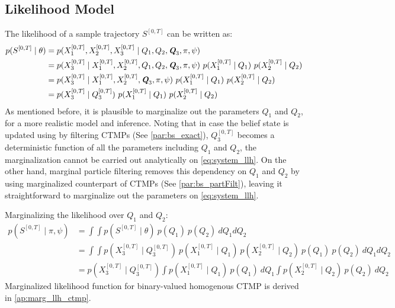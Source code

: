 \subsection{Likelihood Model}
 The likelihood of a sample trajectory $ S^{[0,T]} $ can be written as:
\begin{align}
p(S^{[0,T]} \mid \theta ) & = p(X_{1}^{[0, T]}, X_{2}^{[0, T]}, X_{3}^{[0, T]} \mid Q_{1}, Q_{2}, \textit{\textbf{Q}}_3, \pi, \psi) \nonumber\\
& = p(X_{3}^{[0, T]} \mid X_{1}^{[0, T]}, X_{2}^{[0, T]}, Q_{1}, Q_{2}, \textit{\textbf{Q}}_3, \pi, \psi) \ p(X_{1}^{[0, T]}\mid Q_{1}) \ p(X_{2}^{[0, T]}\mid Q_{2}) \nonumber\\ & = p(X_{3}^{[0, T]} \mid X_{1}^{[0, T]}, X_{2}^{[0, T]}, \textit{\textbf{Q}}_3, \pi, \psi) \ p(X_{1}^{[0, T]}\mid Q_{1}) \ p(X_{2}^{[0, T]}\mid Q_{2}) \nonumber\\ & = p(X_{3}^{[0, T]}\mid Q_{3}^{[0, T]}) \ p(X_{1}^{[0, T]}\mid Q_{1}) \ p(X_{2}^{[0, T]}\mid Q_{2}) 
\label{eq:system_llh}
\end{align}
As mentioned before, it is plausible to marginalize out the parameters $ Q_1 $ and $ Q_2 $, for a more realistic model and inference. Noting that in case the belief state is updated using by filtering CTMPs (See \cref{par:bs_exact}), $ Q_{3}^{[0, T]} $ becomes a deterministic function of all the parameters including $ Q_1 $ and $ Q_2 $, the marginalization cannot be carried out analytically on \autoref{eq:system_llh}. On the other hand, marginal particle filtering removes this dependency on $ Q_1 $ and $ Q_2 $ by using marginalized counterpart of CTMPs (See \cref{par:bs_partFilt}), leaving it straightforward to marginalize out the parameters on \autoref{eq:system_llh}.

Marginalizing the likelihood over $ Q_{1} $ and $ Q_{2} $:
\begin{align}
p(S^{[0,T]} \mid \pi, \psi ) & = 	\int \int p(S^{[0,T]} \mid \theta ) \ p(Q_{1}) \ p(Q_{2}) \ dQ_{1}dQ_{2} \nonumber\\ 
& = \int \int p(X_{3}^{[0, T]}\mid Q_{3}^{[0, T]}) \ p(X_{1}^{[0, T]}\mid Q_{1}) \ p(X_{2}^{[0, T]}\mid Q_{2}) \ p(Q_{1}) \ p(Q_{2})\ dQ_{1}dQ_{2} \nonumber\\ 
& = p(X_{3}^{[0, T]}\mid Q_{3}^{[0, T]}) \int  p(X_{1}^{[0, T]}\mid Q_{1}) \ p(Q_{1}) \ dQ_{1} \int p(X_{2}^{[0, T]}\mid Q_{2})\ p(Q_{2})\ dQ_{2}
\label{eq:Marg_llh}
\end{align}
Marginalized likelihood function for binary-valued homogenous CTMP is derived in \autoref{ap:marg_llh_ctmp}.

